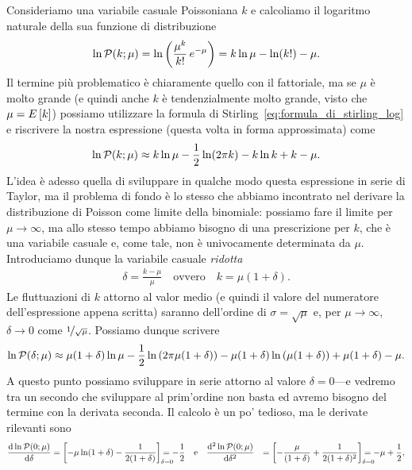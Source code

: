Consideriamo una variabile casuale Poissoniana $k$ e calcoliamo il
logaritmo naturale della sua funzione di distribuzione
\begin{align*}
  \ln\poissonpdf[\mu]{k} = \ln\left( \frac{\mu^k}{k!}\,e^{-\mu} \right) =
  k\ln\mu -\ln(k!) - \mu.
\end{align*}
Il termine più problematico è chiaramente quello con il fattoriale, ma
se $\mu$ è molto grande (e quindi anche $k$ è tendenzialmente molto grande,
visto che $\mu = \displaystyle E\left[k\right]$) possiamo utilizzare la formula di
Stirling~\eqref{eq:formula_di_stirling_log} e riscrivere la nostra espressione
(questa volta in forma approssimata) come
\begin{align*}
  \ln\poissonpdf[\mu]{k} \approx
  k\ln\mu - \frac{1}{2}\ln(2\pi k) - k\ln k + k - \mu.
\end{align*}
L'idea è adesso quella di sviluppare in qualche modo questa espressione in
serie di Taylor, ma il problema di fondo è lo stesso che abbiamo incontrato
nel derivare la distribuzione di Poisson come limite della binomiale: possiamo
fare il limite per $\mu \rightarrow \infty$, ma allo stesso tempo abbiamo
bisogno di una prescrizione per $k$, che è una variabile casuale e, come tale,
non è univocamente determinata da $\mu$. Introduciamo dunque la variabile
casuale \emph{ridotta}
\begin{align*}
  \delta = \frac{k - \mu}{\mu} \quad \text{ovvero} \quad k = \mu(1 + \delta).
\end{align*}
Le fluttuazioni di $k$ attorno al valor medio (e quindi il valore del
numeratore dell'espressione appena scritta) saranno dell'ordine di
$\sigma = \sqrt{\mu}$ e, per $\mu \rightarrow \infty$, $\delta \rightarrow 0$
come $\nicefrac{1}{\sqrt{\mu}}$. Possiamo dunque scrivere
\begin{align*}
  \ln\poissonpdf[\mu]{\delta} \approx
  \mu(1 + \delta)\ln\mu - \frac{1}{2}\ln\left(2\pi \mu(1 + \delta)\right) -
  \mu(1 + \delta)\ln\left(\mu(1 + \delta)\right) + \mu(1 + \delta) - \mu.
\end{align*}
A questo punto possiamo sviluppare in serie attorno al valore $\delta = 0$---e
vedremo tra un secondo che sviluppare al prim'ordine non basta ed avremo
bisogno del termine con la derivata seconda. Il calcolo è un po' tedioso, ma
le derivate rilevanti sono
\begin{align*}
  \td{\ln\poissonpdf[\mu]{0}}{\delta}{} & =
  \at{- \mu \ln(1 + \delta) - \frac{1}{2(1 + \delta)}}{\delta = 0} =
  -\frac{1}{2} \quad \text{e} \quad
  \td[2]{\ln\poissonpdf[\mu]{0}}{\delta}{} & =
  \at{-\frac{\mu}{(1 + \delta)} + \frac{1}{2(1 + \delta)^2}}{\delta = 0} =
  -\mu + \frac{1}{2},
\end{align*}
